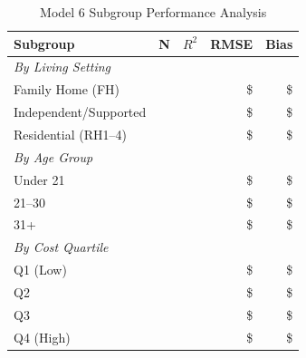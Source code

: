\begin{table}[h]
\centering
\caption{Model 6 Subgroup Performance Analysis}
\begin{tabular}{lrrrr}
\toprule
\textbf{Subgroup} & \textbf{N} & \textbf{$R^2$} & \textbf{RMSE} & \textbf{Bias} \\
\midrule
\multicolumn{5}{l}{\textit{By Living Setting}} \\
Family Home (FH) & \ModelSixSubgrouplivingFHN{} & \ModelSixSubgrouplivingFHRSquared{} & \$\ModelSixSubgrouplivingFHRMSE{} & \$\ModelSixSubgrouplivingFHBias{} \\
Independent/Supported & \ModelSixSubgrouplivingILSLN{} & \ModelSixSubgrouplivingILSLRSquared{} & \$\ModelSixSubgrouplivingILSLRMSE{} & \$\ModelSixSubgrouplivingILSLBias{} \\
Residential (RH1--4) & \ModelSixSubgrouplivingRHOneToFourN{} & \ModelSixSubgrouplivingRHOneToFourRSquared{} & \$\ModelSixSubgrouplivingRHOneToFourRMSE{} & \$\ModelSixSubgrouplivingRHOneToFourBias{} \\
\midrule
\multicolumn{5}{l}{\textit{By Age Group}} \\
Under 21 & \ModelSixSubgroupageAgeUnderTwentyOneN{} & \ModelSixSubgroupageAgeUnderTwentyOneRSquared{} & \$\ModelSixSubgroupageAgeUnderTwentyOneRMSE{} & \$\ModelSixSubgroupageAgeUnderTwentyOneBias{} \\
21--30 & \ModelSixSubgroupageAgeTwentyOneToThirtyN{} & \ModelSixSubgroupageAgeTwentyOneToThirtyRSquared{} & \$\ModelSixSubgroupageAgeTwentyOneToThirtyRMSE{} & \$\ModelSixSubgroupageAgeTwentyOneToThirtyBias{} \\
31+ & \ModelSixSubgroupageAgeThirtyOnePlusN{} & \ModelSixSubgroupageAgeThirtyOnePlusRSquared{} & \$\ModelSixSubgroupageAgeThirtyOnePlusRMSE{} & \$\ModelSixSubgroupageAgeThirtyOnePlusBias{} \\
\midrule
\multicolumn{5}{l}{\textit{By Cost Quartile}} \\
Q1 (Low) & \ModelSixSubgroupcostQOneLowN{} & \ModelSixSubgroupcostQOneLowRSquared{} & \$\ModelSixSubgroupcostQOneLowRMSE{} & \$\ModelSixSubgroupcostQOneLowBias{} \\
Q2 & \ModelSixSubgroupcostQTwoN{} & \ModelSixSubgroupcostQTwoRSquared{} & \$\ModelSixSubgroupcostQTwoRMSE{} & \$\ModelSixSubgroupcostQTwoBias{} \\
Q3 & \ModelSixSubgroupcostQThreeN{} & \ModelSixSubgroupcostQThreeRSquared{} & \$\ModelSixSubgroupcostQThreeRMSE{} & \$\ModelSixSubgroupcostQThreeBias{} \\
Q4 (High) & \ModelSixSubgroupcostQFourHighN{} & \ModelSixSubgroupcostQFourHighRSquared{} & \$\ModelSixSubgroupcostQFourHighRMSE{} & \$\ModelSixSubgroupcostQFourHighBias{} \\
\bottomrule
\end{tabular}
\end{table}

